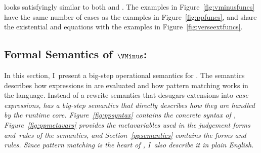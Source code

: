 \documentclass[manuscript,screen,review, 12pt, nonacm]{acmart}
\begin{document}
    \VMinus looks satisfyingly similar to both \PPlus and \VC. The \VMinus
    examples in Figure~\ref{fig:vminusfuncs} have the same number of cases as
    the \PPlus examples in Figure~\ref{fig:ppfuncs}, and share the existential
    and equations with the \VC examples in Figure~\ref{fig:verseextfuncs}. 
   




\subsection{Formal Semantics of $\VMinus$:}

In this section, I~present a big-step operational semantics for \PPlus. The
semantics describes how expressions in \PPlus are evaluated and how pattern
matching works in the language. Instead of a rewrite semantics that desugars
extensions into \it{case} expressions, \PPlus has a big-step semantics that
directly describes how they are handled by the runtime core.
Figure~\ref{fig:ppsyntax} contains the concrete syntax of \PPlus,
Figure~\ref{fig:ppmetavars} provides the metavariables used in the judgement
forms and~rules of the semantics, and Section~\ref{ppsemantics} contains the
forms and rules. Since pattern matching is the heart of \PPlus, I~also
describe it in plain English.
\end{document}

